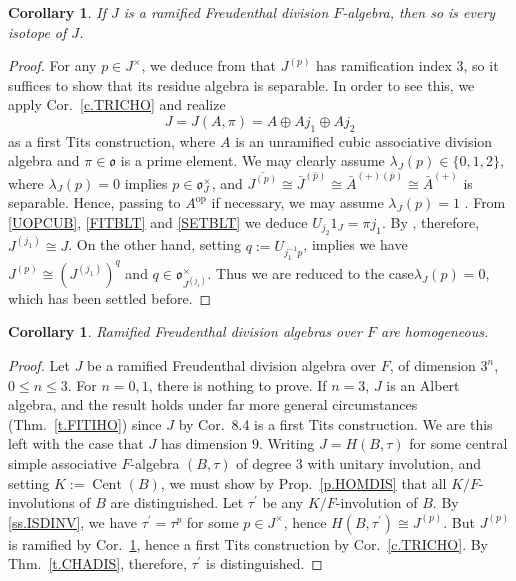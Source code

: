 \documentclass{amsart}
\newtheorem{cor}[equation]{Corollary}
\theoremstyle{definition} %
\theoremstyle{remark} %
\DeclareMathOperator{\Cent}{Cent}
\newcommand{\mfo}{\mathfrak{o}}
\renewcommand{\:}{\colon\,}
\numberwithin{equation}{section}
\begin{document}
\begin{cor} \label{c.RAMISP}
If $J$ is a ramified Freudenthal division $F$-algebra, then so is every isotope of $J$.	
\end{cor}

\begin{proof}
For any $p \in J^\times$, we deduce from \cite[Satz~6.3~(b)]{MR0347922} that $J^{(p)}$ has ramification index $3$, so it suffices to show that its residue algebra is separable. In order to see this, we apply Cor.~\ref{c.TRICHO} and realize
\[
 J = J(A,\pi) = A \oplus Aj_1 \oplus Aj_2
\]	
as a first Tits construction, where $A$ is an unramified cubic associative division algebra and $\pi \in \mfo$ is a prime element. We may clearly assume $\lambda_J(p) \in \{0,1,2\}$, where $\lambda_J(p) = 0$ implies $p \in \mfo_J^\times$, and $\overline{J^{(p)}} \cong \bar J^{(\bar p)} \cong \bar A^{(+)(\bar p)} \cong \bar A^{(+)}$ is separable. Hence, passing to $A^{\mathrm{op}}$ if necessary, we may assume $\lambda_J(p) = 1$ \cite[Exc.~42.22~(c), (d)]{MR4806163}. From \eqref{UOPCUB}, \eqref{FITBLT} and \eqref{SETBLT} we deduce $U_{j_2}1_J = \pi j_1$. By \cite[Cor.~31.23]{MR4806163}, therefore, $J^{(j_1)} \cong J$. On the other hand, setting $q := U_{j_1^{-1}p}$, \cite[Thm.~31.10]{MR4806163} implies we have $J^{(p)} \cong (J^{(j_1)})^q$ and $q \in \mfo_{J^{(j_1)}}^\times$. Thus we are reduced to the case$\lambda_J(p) = 0$, which has been settled before.
\end{proof}

\begin{cor} \label{RAFRHO} 
Ramified Freudenthal division algebras over $F$ are homogeneous.
\end{cor}

\begin{proof}
Let $J$ be a ramified Freudenthal division algebra over $F$, of dimension $3^n$, $0 \leq n \leq3$. For $n = 0,1$, there is nothing to prove. If $n = 3$, $J$ is an Albert algebra, and the result holds under far more general circumstances (Thm.~\ref{t.FITIHO}) since $J$ by Cor.~8.4 is a first Tits construction. We are this left with the case that $J$ has dimension $9$. Writing $J = H(B,\tau)$ for some central simple associative $F$-algebra $(B,\tau)$ of degree $3$ with unitary involution, and setting $K := \Cent(B)$, we must show by Prop.~\ref{p.HOMDIS} that all $K/F$- involutions of $B$ are distinguished. Let $\tau^\prime$ be any $K/F$-involution of $B$. By \ref{ss.ISDINV}, we have $\tau^\prime = \tau^p$ for some $p \in J^\times$, hence $H(B,\tau^\prime) \cong J^{(p)}$. But $J^{(p)}$ is ramified by Cor.~\ref{c.RAMISP}, hence a first Tits construction by Cor.~\ref{c.TRICHO}. By Thm.~\ref{t.CHADIS}, therefore, $\tau^\prime$ is distinguished.
\end{proof}	
\end{document}
